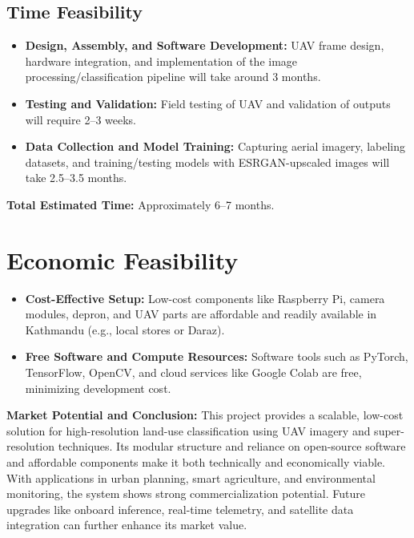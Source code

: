 \subsection{Time Feasibility}
\begin{itemize}
  \item \textbf{Design, Assembly, and Software Development:} UAV frame design, hardware integration, and implementation of the image processing/classification pipeline will take around 3 months.
  \item \textbf{Testing and Validation:} Field testing of UAV and validation of outputs will require 2--3 weeks.
  \item \textbf{Data Collection and Model Training:} Capturing aerial imagery, labeling datasets, and training/testing models with ESRGAN-upscaled images will take 2.5--3.5 months.
\end{itemize}

\noindent\textbf{Total Estimated Time:} Approximately 6--7 months.

\section{Economic Feasibility}

\begin{itemize}
  \item \textbf{Cost-Effective Setup:} Low-cost components like Raspberry Pi, camera modules, depron, and UAV parts are affordable and readily available in Kathmandu (e.g., local stores or Daraz).
  \item \textbf{Free Software and Compute Resources:} Software tools such as PyTorch, TensorFlow, OpenCV, and cloud services like Google Colab are free, minimizing development cost.
\end{itemize}

\noindent\textbf{Market Potential and Conclusion:}  
This project provides a scalable, low-cost solution for high-resolution land-use classification using UAV imagery and super-resolution techniques. Its modular structure and reliance on open-source software and affordable components make it both technically and economically viable. With applications in urban planning, smart agriculture, and environmental monitoring, the system shows strong commercialization potential. Future upgrades like onboard inference, real-time telemetry, and satellite data integration can further enhance its market value.
